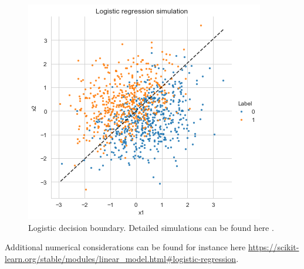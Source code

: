 \begin{figure}
\begin{center}
\includegraphics[width = .7\linewidth]{./Illustrations/logistic_decision.png}
\end{center}
\caption{Logistic decision boundary. Detailed simulations can be found here \cite{https://sylvainlc.github.io/}.}
\end{figure}


Additional numerical considerations can be found for instance here \url{https://scikit-learn.org/stable/modules/linear\_model.html#logistic-regression}.


